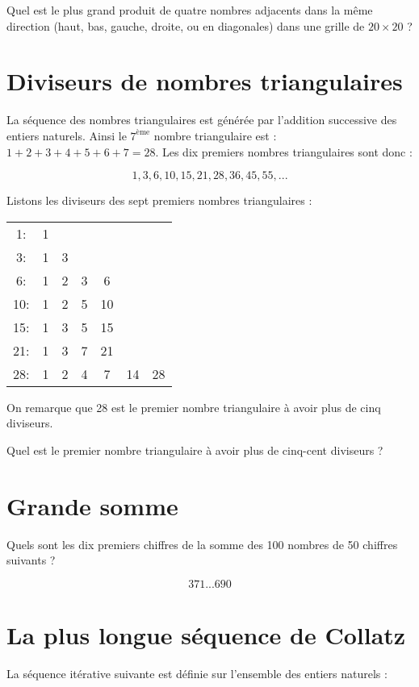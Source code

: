 Quel est le plus grand produit de quatre nombres adjacents dans la même direction (haut, bas, gauche, droite, ou en diagonales) dans une grille de $20\times20$ ?


\section{Diviseurs de nombres triangulaires} \label{pb.012}
La séquence des nombres triangulaires est générée par l'addition successive des entiers naturels. Ainsi le $7^{\text{ème}}$ nombre triangulaire est : $1 + 2 + 3 + 4 + 5 + 6 + 7 = 28$. Les dix premiers nombres triangulaires sont donc :

$$1, 3, 6, 10, 15, 21, 28, 36, 45, 55, ...$$

Listons les diviseurs des sept premiers nombres triangulaires :
\begin{center}
    \begin{tabular}{ccccccc}
         1: & 1\\
         3: & 1 & 3\\
         6: & 1 & 2 & 3 & 6\\
        10: & 1 & 2 & 5 & 10\\
        15: & 1 & 3 & 5 & 15\\
        21: & 1 & 3 & 7 & 21\\
        28: & 1 & 2 & 4 & 7 & 14 & 28\\
    \end{tabular}
\end{center}

On remarque que 28 est le premier nombre triangulaire à avoir plus de cinq diviseurs.

Quel est le premier nombre triangulaire à avoir plus de cinq-cent diviseurs ?


\section{Grande somme} \label{pb.013}

Quels sont les dix premiers chiffres de la somme des 100 nombres de 50 chiffres suivants ?

$$371...690$$


\section{La plus longue séquence de Collatz} \label{pb.014}
La séquence itérative suivante est définie sur l'ensemble des entiers naturels :

